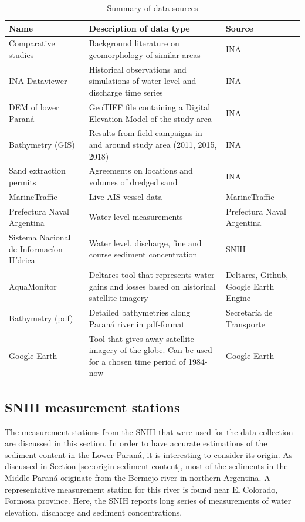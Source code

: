 \begin{table}[H]
    \centering
    \renewcommand{\arraystretch}{1.2} %
    \setlength{\tabcolsep}{4pt}       %
    \begin{tabularx}{\textwidth}{p{3.5cm}p{8cm}p{3.5cm}}
        \toprule
        Name & Description of data type & Source \\
        \midrule
        Comparative studies  & Background literature on geomorphology of similar areas & INA   \\
        INA Dataviewer         & Historical observations and simulations of water level and discharge time series & INA  \\
        DEM of lower Paraná & GeoTIFF file containing a Digital Elevation Model of the study area & INA \\
        Bathymetry (GIS) & Results from field campaigns in and around study area (2011, 2015, 2018) & INA \\
        Sand extraction permits & Agreements on locations and volumes of dredged sand & INA \\
        MarineTraffic & Live AIS vessel data & MarineTraffic \\
        Prefectura Naval Argentina  & Water level measurements & Prefectura Naval Argentina   \\
        Sistema Nacional de Informacíon Hídrica & Water level, discharge, fine and course sediment concentration & SNIH \\
        AquaMonitor & Deltares tool that represents water gains and losses based on historical satellite imagery & Deltares, Github, Google Earth Engine \\
        Bathymetry (pdf) & Detailed bathymetries along Paraná river in pdf-format & Secretaría de Transporte \\
        Google Earth & Tool that gives away satellite imagery of the globe. Can be used for a chosen time period of 1984-now & Google Earth  \\
        \bottomrule
    \end{tabularx}
    \caption{Summary of data sources}
    \label{tab:data collection summary}
\end{table}

\subsection{SNIH measurement stations}
\label{sec:measurementstations}
The measurement stations from the SNIH that were used for the data collection are discussed in this section. In order to have accurate estimations of the sediment content in the Lower Paraná, it is interesting to consider its origin. As discussed in Section \ref{sec:origin sediment content}, most of the sediments in the Middle Paraná originate from the Bermejo river in northern Argentina. A representative measurement station for this river is found near El Colorado, Formosa province. Here, the SNIH reports long series of measurements of water elevation, discharge and sediment concentrations.

